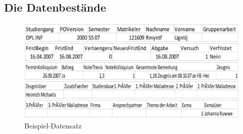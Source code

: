 \subsection{Die Datenbestände}

\begin{figure}[H]
	\centering
	\includegraphics[scale=0.3]{images/beispieldatensatzcsv.jpg} 
	\caption{Beispiel-Datensatz}\label{fig:schema2}
\end{figure}
